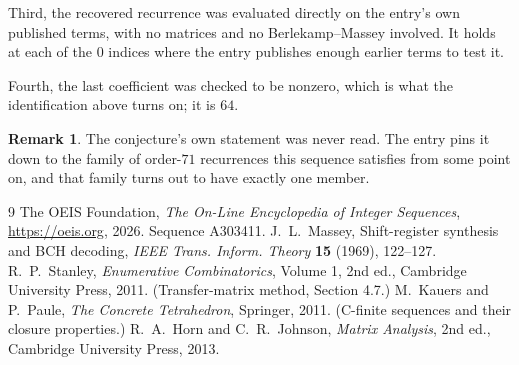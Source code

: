 \documentclass[11pt,a4paper]{article}
\theoremstyle{plain}
\theoremstyle{definition}
\newtheorem{remark}[theorem]{Remark}
\begin{document}
Third, the recovered recurrence was evaluated directly on the entry's own published terms, with
no matrices and no Berlekamp--Massey involved. It holds at each of the $0$ indices where
the entry publishes enough earlier terms to test it.

Fourth, the last coefficient was checked to be nonzero, which is what the identification above
turns on; it is $64$.

\begin{remark}
The conjecture's own statement was never read. The entry pins it down to the family of
order-$71$ recurrences this sequence satisfies from some point on, and that family turns
out to have exactly one member.
\end{remark}

\begin{thebibliography}{9}
 The OEIS Foundation, \emph{The On-Line Encyclopedia of Integer
Sequences}, \url{https://oeis.org}, 2026. Sequence A303411.
 J.~L.~Massey, Shift-register synthesis and BCH decoding, \emph{IEEE
Trans. Inform. Theory} \textbf{15} (1969), 122--127.
 R.~P.~Stanley, \emph{Enumerative Combinatorics}, Volume 1, 2nd ed.,
Cambridge University Press, 2011. (Transfer-matrix method, Section 4.7.)
 M.~Kauers and P.~Paule, \emph{The Concrete Tetrahedron}, Springer, 2011.
(C-finite sequences and their closure properties.)
 R.~A.~Horn and C.~R.~Johnson, \emph{Matrix Analysis}, 2nd ed., Cambridge
University Press, 2013.
\end{thebibliography}
\end{document}
